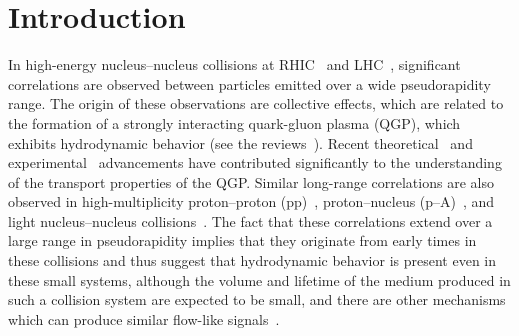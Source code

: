 
\section{Introduction}
\label{sec:intro}

In high-energy nucleus--nucleus collisions at RHIC~\cite{Adams:2005dq,Adcox:2004mh,Arsene:2004fa,Back:2004je} and LHC~\cite{Abelev:2012di, Abelev:2014pua, ATLAS:2011ah}, significant correlations are observed between particles emitted over a wide pseudorapidity range. The origin of these observations are collective effects, which are related to the formation of a strongly interacting quark-gluon plasma (QGP), which exhibits hydrodynamic behavior (see the reviews~\cite{Romatschke:2007mq,Jeon:2015dfa,Romatschke:2017ejr}). 
Recent theoretical~\cite{Niemi:2015qia,Bernhard:2016tnd,Bernhard:2019bmu} and experimental~\cite{ALICE:2016kpq,Acharya:2017gsw,Acharya:2017zfg,Acharya:2020taj} advancements have contributed significantly to the understanding of the transport properties of the QGP.
Similar long-range correlations are also observed in high-multiplicity proton--proton (pp)~\cite{Aad:2015gqa,Khachatryan:2015lva,Khachatryan:2016txc,Acharya:2019vdf}, proton--nucleus (p--A)~\cite{Abelev:2012ola,Aad:2014lta,Aaboud:2016yar,Khachatryan:2016ibd}, and light nucleus--nucleus collisions~\cite{PHENIX:2018lia,Aidala:2017ajz}. The fact that these correlations extend over a large range in pseudorapidity implies that they originate from early times in these collisions and thus suggest that hydrodynamic behavior is present even in these small systems, although the volume and lifetime of the medium produced in such a collision system are expected to be small, and there are other mechanisms which can produce similar flow-like signals~\cite{Busza:2018rrf,Nagle:2018nvi}.

